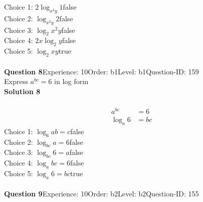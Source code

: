 \documentclass{article}
\begin{document}
Choice 1: \hspace{20pt}$2\log_{x^2y}1$\hspace{20pt}false\\
Choice 2: \hspace{20pt}$\log_{x^2y}2$\hspace{20pt}false\\
Choice 3: \hspace{20pt}$\log_{2}x^2y$\hspace{20pt}false\\
Choice 4: \hspace{20pt}$2x\log_{2}y$\hspace{20pt}false\\
Choice 5: \hspace{20pt}$\log_{2}xy$\hspace{20pt}true\\
\\[4pt]
\noindent\textbf{Question 8}\hspace{20pt}Experience: 10\hspace{20pt}Order: b1\hspace{20pt}Level: b1\hspace{20pt}Question-ID: 159\\[2pt]
Express $a^{bc}=6$ in log form\\[4pt]
\noindent\textbf{Solution 8}\\[2pt]
\\[-35pt]\begin{align*}
a^{bc}&=6\\[2pt]
\log_{a}6&=bc
\end{align*}
Choice 1: \hspace{20pt}$\log_{6}ab=c$\hspace{20pt}false\\
Choice 2: \hspace{20pt}$\log_{bc}a=6$\hspace{20pt}false\\
Choice 3: \hspace{20pt}$\log_{bc}6=a$\hspace{20pt}false\\
Choice 4: \hspace{20pt}$\log_{a}bc=6$\hspace{20pt}false\\
Choice 5: \hspace{20pt}$\log_{a}6=bc$\hspace{20pt}true\\
\\[4pt]
\noindent\textbf{Question 9}\hspace{20pt}Experience: 10\hspace{20pt}Order: b2\hspace{20pt}Level: b2\hspace{20pt}Question-ID: 155\\[2pt]
\end{document}

